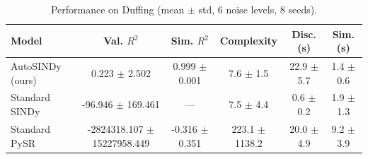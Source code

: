 \begin{table}[htbp]
\centering
\small
\renewcommand{\arraystretch}{1.2}
\caption{Performance on Duffing (mean $\pm$ std, 6 noise levels, 8 seeds).}
\label{tab:autosindy_duffing}
\begin{tabular}{lccccc}
\toprule
Model & Val. $R^2$ & Sim. $R^2$ & Complexity & Disc. (s) & Sim. (s) \\
\midrule
AutoSINDy (ours) & 0.223 $\pm$ 2.502 & 0.999 $\pm$ 0.001 & 7.6 $\pm$ 1.5 & 22.9 $\pm$ 5.7 & 1.4 $\pm$ 0.6 \\
Standard SINDy & -96.946 $\pm$ 169.461 & --- & 7.5 $\pm$ 4.4 & 0.6 $\pm$ 0.2 & 1.9 $\pm$ 1.3 \\
Standard PySR & -2824318.107 $\pm$ 15227958.449 & -0.316 $\pm$ 0.351 & 223.1 $\pm$ 1138.2 & 20.0 $\pm$ 4.9 & 9.2 $\pm$ 3.9 \\
\bottomrule
\end{tabular}
\end{table}